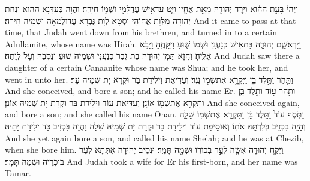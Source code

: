 \newperek
{}
{וַֽיְהִי֙ בָּעֵ֣ת הַהִ֔וא וַיֵּ֥רֶד יְהוּדָ֖ה מֵאֵ֣ת אֶחָ֑יו וַיֵּ֛ט עַד\maqqaf אִ֥ישׁ עֲדֻלָּמִ֖י וּשְׁמ֥וֹ חִירָֽה׃}
{וַהֲוָה בְּעִדָּנָא הַהוּא וּנְחַת יְהוּדָה מִלְּוָת אֲחוֹהִי וּסְטָא לְוָת גֻּבְרָא עֲדוּלְמָאָה וּשְׁמֵיהּ חִירָה׃}
{And it came to pass at that time, that Judah went down from his brethren, and turned in to a certain Adullamite, whose name was Hirah.}{}
{וַיַּרְא\maqqaf שָׁ֧ם יְהוּדָ֛ה בַּת\maqqaf אִ֥ישׁ כְּנַעֲנִ֖י וּשְׁמ֣וֹ שׁ֑וּעַ וַיִּקָּחֶ֖הָ וַיָּבֹ֥א אֵלֶֽיהָ׃}
{וַחֲזָא תַּמָּן יְהוּדָה בַּת גְּבַר כְּנַעֲנִי וּשְׁמֵיהּ שׁוּעַ וְנַסְבַּהּ וְעָל לְוָתַהּ׃}
{And Judah saw there a daughter of a certain Canaanite whose name was Shua; and he took her, and went in unto her.}{}
{וַתַּ֖הַר וַתֵּ֣לֶד בֵּ֑ן וַיִּקְרָ֥א אֶת\maqqaf שְׁמ֖וֹ עֵֽר׃}
{וְעַדִּיאַת וִילֵידַת בַּר וּקְרָא יָת שְׁמֵיהּ עֵר׃}
{And she conceived, and bore a son; and he called his name Er.}{}
{וַתַּ֥הַר ע֖וֹד וַתֵּ֣לֶד בֵּ֑ן וַתִּקְרָ֥א אֶת\maqqaf שְׁמ֖וֹ אוֹנָֽן׃}
{וְעַדִּיאַת עוֹד וִילֵידַת בַּר וּקְרָת יָת שְׁמֵיהּ אוֹנָן׃}
{And she conceived again, and bore a son; and she called his name Onan.}{}
{וַתֹּ֤סֶף עוֹד֙ וַתֵּ֣לֶד בֵּ֔ן וַתִּקְרָ֥א אֶת\maqqaf שְׁמ֖וֹ שֵׁלָ֑ה וְהָיָ֥ה בִכְזִ֖יב בְּלִדְתָּ֥הּ אֹתֽוֹ׃}
{וְאוֹסֵיפַת עוֹד וִילֵידַת בַּר וּקְרָת יָת שְׁמֵיהּ שֵׁלָה וַהֲוָה בִּכְזִיב כַּד יְלֵידַת יָתֵיהּ׃}
{And she yet again bore a son, and called his name Shelah; and he was at Chezib, when she bore him.}{}
{וַיִּקַּ֧ח יְהוּדָ֛ה אִשָּׁ֖ה לְעֵ֣ר בְּכוֹר֑וֹ וּשְׁמָ֖הּ תָּמָֽר׃}
{וּנְסֵיב יְהוּדָה אִתְּתָא לְעֵר בּוּכְרֵיהּ וּשְׁמַהּ תָּמָר׃}
{And Judah took a wife for Er his first-born, and her name was Tamar.}{}
